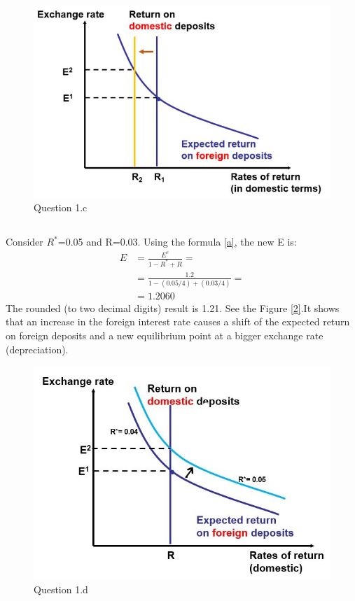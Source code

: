\documentclass[	11pt, ]{fphw}
\begin{document}
\begin{figure}[h] 
\centering 
\includegraphics[scale=0.7]{figc.JPG} 
\caption{Question 1.c} 
\label{1}
\end{figure}

\subsection{}
Consider $R^{*}$=0.05 and R=0.03. Using the formula \ref{a}, the new E is:
\begin{equation} 
\begin{aligned}    
E & = \frac{E^{e}}{1-R^{*}+R} = \\
  & = \frac{ 1.2 }{ 1- (0.05/4) + (0.03/4) } =\\
  & = 1.2060
\end{aligned} 
\end{equation}
The rounded (to two decimal digits) result is 1.21. See the Figure \vref{2}.It shows that an increase in the foreign interest rate causes a shift of the expected return on foreign deposits and a new equilibrium point at a bigger exchange rate (depreciation).

\begin{figure}[h] 
\centering 
\includegraphics[scale=0.5]{figd.jpg} 
\caption{Question 1.d} 
\label{2}
\end{figure}
\end{document}
